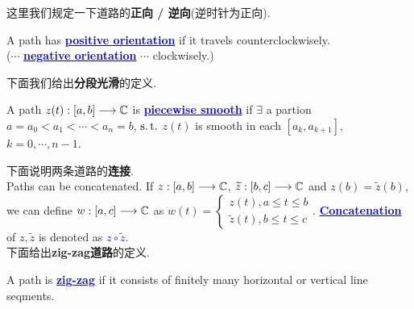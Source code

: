 \newpage
这里我们规定一下道路的\textbf{正向 / 逆向}(逆时针为正向).
\begin{defn}\label{def 3.4.5}
	A path has \underline{\textcolor{blue}{\textbf{positive orientation}}} if it travels counterclockwisely.\\
	($\cdots$ \underline{\textcolor{blue}{\textbf{negative orientation}}} $\cdots$ clockwisely.)
\end{defn}

\vspace{2em}
下面我们给出\textbf{分段光滑}的定义.
\begin{defn}\label{def 3.4.6}
	A path $z(t) : [a , b] \longrightarrow \mathbb{C}$ is \underline{\textcolor{blue}{\textbf{piecewise smooth}}} if $\exists$ a partion $a = a_0 < a_1 < \cdots < a_n = b$, $\operatorname{s.t.}$ $z(t)$ is smooth in each $[a_k , a_{k + 1}]$, $k = 0 , \cdots , n - 1$.
\end{defn}

\vspace{2em}
下面说明两条道路的\textbf{连接}.\\
Paths can be concatenated. If $z : [a , b] \longrightarrow \mathbb{C}$, $\widetilde{z} : [b , c] \longrightarrow \mathbb{C}$ and $z(b) = \widetilde{z}(b)$, we can define $w : [a , c] \longrightarrow \mathbb{C}$ as $w(t) = 
\begin{cases}
	z(t) , a \leq t \leq b\\
	\widetilde{z}(t) , b \leq t \leq c
\end{cases}$.
\underline{\textcolor{blue}{\textbf{Concatenation}}} of $z , \widetilde{z}$ is denoted as \textcolor{blue}{$z \circ \widetilde{z}$}.\\

\vspace{2em}
下面给出\textbf{zig-zag道路}的定义.
\begin{defn}\label{def 3.4.7}
	A path is \underline{\textcolor{blue}{\textbf{zig-zag}}} if it consists of finitely many horizontal or vertical line seqments.
\end{defn}

